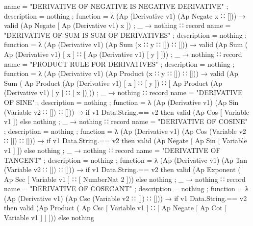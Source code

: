 \documentclass{report}
\begin{document}
\begin{code}
          { name = "DERIVATIVE OF NEGATIVE IS NEGATIVE DERIVATIVE"
          ; description = nothing
          ; function =
            λ { (Ap (Derivative v1) (Ap Negate x ∷ [])) →
                valid (Ap Negate [ Ap (Derivative v1) x ])
              ; _ → nothing}
          }
      ∷ record
          { name = "DERIVATIVE OF SUM IS SUM OF DERIVATIVES"
          ; description = nothing
          ; function =
            λ { (Ap (Derivative v1) (Ap Sum (x ∷ y ∷ []) ∷ [])) →
                valid (Ap Sum ( Ap (Derivative v1) [ x ]
                              ∷ [ Ap (Derivative v1) [ y ] ]))
              ; _ → nothing}
          }
      ∷ record
          { name = "PRODUCT RULE FOR DERIVATIVES"
          ; description = nothing
          ; function =
            λ { (Ap (Derivative v1) (Ap Product (x ∷ y ∷ []) ∷ [])) →
                valid (Ap Sum
                          ( Ap Product (Ap (Derivative v1) [ x ] ∷ [ y ])
                          ∷ [ Ap Product (Ap (Derivative v1) [ y ] ∷ [ x ])]))
              ; _ → nothing}
          }
      ∷ record
          { name = "DERIVATIVE OF SINE"
          ; description = nothing
          ; function =
            λ { (Ap (Derivative v1) (Ap Sin (Variable v2 ∷ []) ∷ [])) →
                if v1 Data.String.== v2
                  then valid (Ap Cos [ Variable v1 ])
                  else nothing
              ; _ → nothing}
          }
      ∷ record
          { name = "DERIVATIVE OF COSINE"
          ; description = nothing
          ; function =
            λ { (Ap (Derivative v1) (Ap Cos (Variable v2 ∷ []) ∷ [])) →
                if v1 Data.String.== v2
                  then valid (Ap Negate [ Ap Sin [ Variable v1 ] ])
                  else nothing
              ; _ → nothing}
          }
      ∷ record
          { name = "DERIVATIVE OF TANGENT"
          ; description = nothing
          ; function =
             λ { (Ap (Derivative v1) (Ap Tan (Variable v2 ∷ []) ∷ [])) →
                 if v1 Data.String.== v2
                   then valid (Ap Exponent ( Ap Sec [ Variable v1 ] ∷ [ NumberNat 2 ]))
                   else nothing
               ; _ → nothing}
          }
      ∷ record
          { name = "DERIVATIVE OF COSECANT"
          ; description = nothing
          ; function =
            λ { (Ap (Derivative v1) (Ap Csc (Variable v2 ∷ []) ∷ [])) →
                if v1 Data.String.== v2
                  then valid (Ap Product
                                 ( Ap Csc [ Variable v1 ]
                                 ∷ [ Ap Negate [ Ap Cot [ Variable v1 ] ] ]))
                  else nothing
}}
\end{code}
\end{document}
